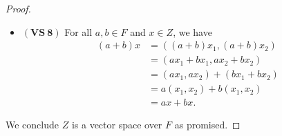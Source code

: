 \begin{Exercise}
\begin{proof}
\begin{itemize}
			\item $\mathbf{(VS\ 8)}$
			For all $a,b\in F$ and $x\in Z$, we have
			\begin{align*}
				(a+b)x
				&= ( (a+b) x_1, (a+b) x_2 ) \\
				&= ( a x_1 + b x_1, a x_2 + b x_2 ) \\
				&= (a x_1, a x_2) + (b x_1 + b x_2) \\
				&= a(x_1, x_2) + b(x_1, x_2) \\
				&= a x + b x.
			\end{align*}
		\end{itemize}
		We conclude $Z$ is a vector space over $F$ as promised.
	\end{proof}
\end{Exercise}